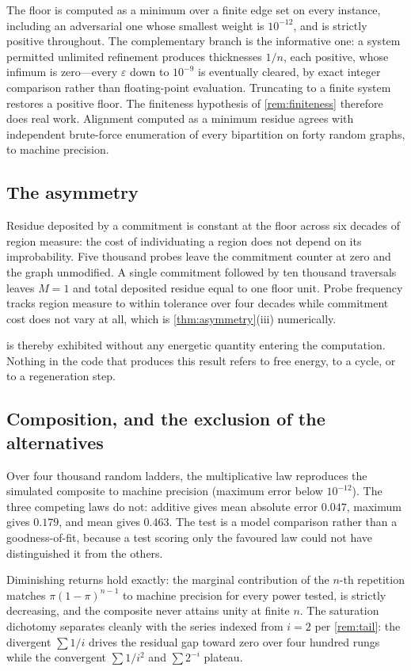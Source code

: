 \documentclass[11pt,twocolumn,a4paper]{article}
\theoremstyle{plain}
\theoremstyle{definition}
\theoremstyle{remark}
\newcommand{\pow}{\pi}
\begin{document}
The floor is computed as a minimum over a finite edge set on every instance,
including an adversarial one whose smallest weight is $10^{-12}$, and is
strictly positive throughout. The complementary branch is the informative one:
a system permitted unlimited refinement produces thicknesses $1/n$, each
positive, whose infimum is zero---every $\varepsilon$ down to $10^{-9}$ is
eventually cleared, by exact integer comparison rather than floating-point
evaluation. Truncating to a finite system restores a positive floor. The
finiteness hypothesis of \cref{rem:finiteness} therefore does real work.
Alignment computed as a minimum residue agrees with independent brute-force
enumeration of every bipartition on forty random graphs, to machine precision.

\subsection{The asymmetry}

Residue deposited by a commitment is constant at the floor across six decades
of region measure: the cost of individuating a region does not depend on its
improbability. Five thousand probes leave the commitment counter at zero and the
graph unmodified. A single commitment followed by ten thousand traversals leaves
$M = 1$ and total deposited residue equal to one floor unit. Probe frequency
tracks region measure to within tolerance over four decades while commitment
cost does not vary at all, which is \cref{thm:asymmetry}(iii) numerically.

 is thereby exhibited without any energetic quantity entering
the computation. Nothing in the code that produces this result refers to free
energy, to a cycle, or to a regeneration step.

\subsection{Composition, and the exclusion of the alternatives}

Over four thousand random ladders, the multiplicative law reproduces the
simulated composite to machine precision (maximum error below $10^{-12}$). The
three competing laws do not: additive gives mean absolute error $0.047$, maximum
gives $0.179$, and mean gives $0.463$. The test is a model comparison rather
than a goodness-of-fit, because a test scoring only the favoured law could not
have distinguished it from the others.

Diminishing returns hold exactly: the marginal contribution of the $n$-th
repetition matches $\pow(1-\pow)^{n-1}$ to machine precision for every power
tested, is strictly decreasing, and the composite never attains unity at finite
$n$. The saturation dichotomy separates cleanly with the series indexed from
$i = 2$ per \cref{rem:tail}: the divergent $\sum 1/i$ drives the residual gap
toward zero over four hundred rungs while the convergent $\sum 1/i^2$ and
$\sum 2^{-i}$ plateau.
\end{document}
